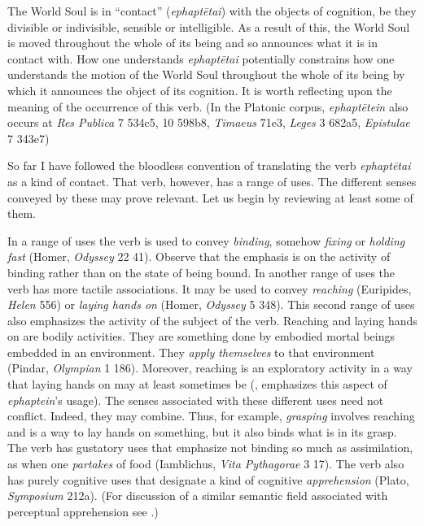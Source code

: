 The World Soul is in ``contact'' (\emph{ephaptētai}) with the objects of cognition, be they divisible or indivisible, sensible or intelligible. As a result of this, the World Soul is moved throughout the whole of its being and so announces what it is in contact with. How one understands \emph{ephaptētai} potentially constrains how one understands the motion of the World Soul throughout the whole of its being by which it announces the object of its cognition. It is worth reflecting upon the meaning of the occurrence of this verb. (In the Platonic corpus, \emph{ephaptētein} also occurs at \emph{Res Publica} 7 534c5, 10 598b8, \emph{Timaeus} 71e3, \emph{Leges} 3 682a5, \emph{Epistulae} 7 343e7)

So far I have followed the bloodless convention of translating the verb \emph{ephaptētai} as a kind of contact. That verb, however, has a range of uses. The different senses conveyed by these may prove relevant. Let us begin by reviewing at least some of them.

In a range of uses the verb is used to convey \emph{binding}, somehow \emph{fixing} or \emph{holding fast} (Homer, \emph{Odyssey} 22 41). Observe that the emphasis is on the activity of binding rather than on the state of being bound. In another range of uses the verb has more tactile associations. It may be used to convey \emph{reaching} (Euripides, \emph{Helen} 556) or \emph{laying hands on} (Homer, \emph{Odyssey} 5 348). This second range of uses also emphasizes the activity of the subject of the verb. Reaching and laying hands on are bodily activities. They are something done by embodied mortal beings embedded in an environment. They \emph{apply themselves} to that environment (Pindar, \emph{Olympian} 1 186). Moreover, reaching is an exploratory activity in a way that laying hands on may at least sometimes be (\citealt[134]{Betegh:2019fq}, emphasizes this aspect of \emph{ephaptein}'s usage). The senses associated with these different uses need not conflict. Indeed, they may combine. Thus, for example, \emph{grasping} involves reaching and is a way to lay hands on something, but it also binds what is in its grasp. The verb has gustatory uses that emphasize not binding so much as assimilation, as when one \emph{partakes} of food (Iamblichus, \emph{Vita Pythagorae} 3 17). The verb also has purely cognitive uses that designate a kind of cognitive \emph{apprehension} (Plato, \emph{Symposium} 212a). (For discussion of a similar semantic field associated with perceptual apprehension see \citealt[chapters 1--2]{Kalderon:2018oe}.)

